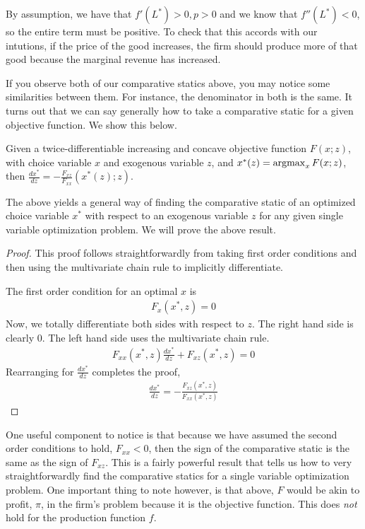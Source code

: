 \begin{description}
    By assumption, we have that $f'(L^*) > 0, p > 0$ and we know that $f''(L^*) < 0$, so the entire term must be positive. To check that this accords with our intutions, if the price of the good increases, the firm should produce more of that good because the marginal revenue has increased. 
\end{description}

If you observe both of our comparative statics above, you may notice some similarities between them. For instance, the denominator in both is the same. It turns out that we can say generally how to take a comparative static for a given objective function. We show this below.

\begin{proposition*} \label{prop:single_var_static}
    Given a twice-differentiable increasing and concave objective function $F(x; z)$, with choice variable $x$ and exogenous variable $z$, and $x^*(z) = \operatorname*{arg max}_{x} F(x; z)$, then $\frac{dx^*}{dz} = - \frac{F_{xz}}{F_{xx}}(x^*(z); z)$. 
\end{proposition*}

The above yields a general way of finding the comparative static of an optimized choice variable $x^*$ with respect to an exogenous variable $z$ for any given single variable optimization problem. We will prove the above result.

\begin{proof}
    This proof follows straightforwardly from taking first order conditions and then using the multivariate chain rule to implicitly differentiate. 

    The first order condition for an optimal $x$ is
    \begin{align*}
        F_x(x^*, z) = 0
    \end{align*}
    Now, we totally differentiate both sides with respect to $z$. The right hand side is clearly 0. The left hand side uses the multivariate chain rule.
    \begin{align*}
        F_{xx}(x^*, z) \frac{dx^*}{dz} + F_{xz}(x^*, z) = 0
    \end{align*}
    Rearranging for $\frac{dx^*}{dz}$ completes the proof,
    \begin{align*}
        \frac{dx^*}{dz} = -\frac{F_{xz}(x^*, z)}{F_{xx}(x^*, z)}
    \end{align*}
\end{proof}

One useful component to notice is that because we have assumed the second order conditions to hold, $F_{xx} < 0$, then the sign of the comparative static is the same as the sign of $F_{xz}$. This is a fairly powerful result that tells us how to very straightforwardly find the comparative statics for a single variable optimization problem. One important thing to note however, is that above, $F$ would be akin to profit, $\pi$, in the firm's problem because it is the objective function. This does \emph{not} hold for the production function $f$. 

